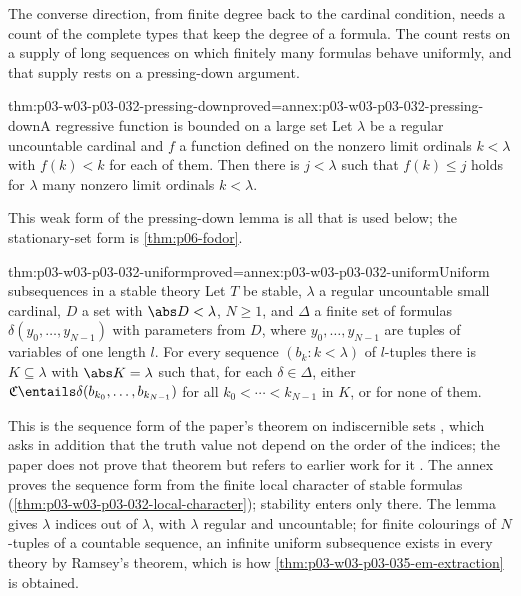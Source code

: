 The converse direction, from finite degree back to the cardinal condition,
needs a count of the complete types that keep the degree of a formula.  The
count rests on a supply of long sequences on which finitely many formulas
behave uniformly, and that supply rests on a pressing-down argument.

\begin{hblemma}{thm:p03-w03-p03-032-pressing-down}{proved=annex:p03-w03-p03-032-pressing-down}{A regressive function is bounded on a large set}
Let \(\lambda\) be a regular uncountable cardinal and \(f\) a function
defined on the nonzero limit ordinals \(k<\lambda\) with \(f(k)<k\) for each of
them.  Then there is \(j<\lambda\) such that \(f(k)\leq j\) holds for
\(\lambda\) many nonzero limit ordinals \(k<\lambda\).
\end{hblemma}

This weak form of the pressing-down lemma is all that is used below; the
stationary-set form is \cref{thm:p06-fodor}.

\begin{hblemma}{thm:p03-w03-p03-032-uniform}{proved=annex:p03-w03-p03-032-uniform}{Uniform subsequences in a stable theory}
Let \(T\) be stable, \(\lambda\) a regular uncountable small cardinal,
\(D\) a set with \(\abs D<\lambda\), \(N\geq1\), and \(\Delta\) a finite
set of formulas \(\delta(y_0,\ldots,y_{N-1})\) with parameters from \(D\),
where \(y_0,\ldots,y_{N-1}\) are tuples of variables of one length \(l\).
For every sequence \((b_k:k<\lambda)\) of \(l\)-tuples there is
\(K\subseteq\lambda\) with \(\abs K=\lambda\) such that, for each
\(\delta\in\Delta\), either
\(\mathfrak C\entails\delta(b_{k_0},\ldots,b_{k_{N-1}})\) for all
\(k_0<\cdots<k_{N-1}\) in \(K\), or for none of them.
\end{hblemma}

This is the sequence form of the paper's theorem on indiscernible sets
\cite[Theorem~5.8\,(A), p.~340]{Shelah1971Stability}, which asks in addition
that the truth value not depend on the order of the indices; the paper does
not prove that theorem but refers to earlier work for it
\cite[Remark after Theorem~5.8, p.~340]{Shelah1971Stability}.  The annex
proves the sequence form from the finite local character of stable formulas
(\cref{thm:p03-w03-p03-032-local-character}); stability enters only there.
The lemma gives \(\lambda\) indices out of \(\lambda\), with \(\lambda\)
regular and uncountable; for finite colourings of \(N\)-tuples of a
countable sequence, an infinite uniform subsequence exists in every theory by
Ramsey's theorem, which is how
\cref{thm:p03-w03-p03-035-em-extraction} is obtained.

